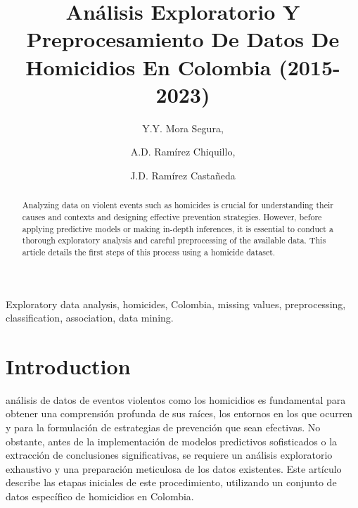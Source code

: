 \documentclass[lettersize,journal]{IEEEtran}
\begin{document}
\title{Análisis Exploratorio Y Preprocesamiento De Datos De Homicidios En Colombia (2015-2023)}

\author{
  Y.Y. Mora Segura, 
  \and
  A.D. Ramírez Chiquillo, 
  \and
  J.D. Ramírez Castañeda 
}
\maketitle
\begin{abstract}
Analyzing data on violent events such as homicides is crucial for understanding their causes and contexts and designing effective prevention strategies. However, before applying predictive models or making in-depth inferences, it is essential to conduct a thorough exploratory analysis and careful preprocessing of the available data. This article details the first steps of this process using a homicide dataset.
\end{abstract}


\begin{IEEEkeywords}
Exploratory data analysis, homicides, Colombia, missing values, preprocessing, classification, association, data mining.
\end{IEEEkeywords}

\section{Introduction}
 análisis de datos de eventos violentos como los homicidios es fundamental para obtener una comprensión
 profunda de sus raíces, los entornos en los que ocurren y para la formulación de estrategias de prevención que sean efectivas.
 No obstante, antes de la implementación de modelos predictivos sofisticados o la extracción de conclusiones significativas,
 se requiere un análisis exploratorio exhaustivo y una preparación meticulosa de los datos existentes. Este artículo describe
  las etapas iniciales de este procedimiento, utilizando un conjunto de datos específico de homicidios en Colombia.
\end{document}

